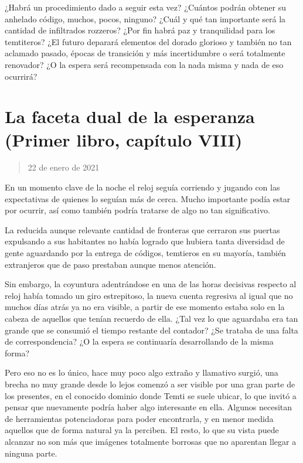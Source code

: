 \documentclass[
  spanish,
]{book}
\begin{document}
¿Habrá un procedimiento dado a seguir esta vez? ¿Cuántos podrán obtener su anhelado código, muchos, pocos, ninguno? ¿Cuál y qué tan importante será la cantidad de infiltrados rozzeros? ¿Por fin habrá paz y tranquilidad para los temtiteros? ¿El futuro deparará elementos del dorado glorioso y también no tan aclamado pasado, épocas de transición y más incertidumbre o será totalmente renovador? ¿O la espera será recompensada con la nada misma y nada de eso ocurrirá?

\hypertarget{la-faceta-dual-de-la-esperanza-primer-libro-capuxedtulo-viii}{%
\section{La faceta dual de la esperanza (Primer libro, capítulo VIII)}\label{la-faceta-dual-de-la-esperanza-primer-libro-capuxedtulo-viii}}

\begin{quote}
22 de enero de 2021
\end{quote}

En un momento clave de la noche el reloj seguía corriendo y jugando con las expectativas de quienes lo seguían más de cerca. Mucho importante podía estar por ocurrir, así como también podría tratarse de algo no tan significativo.

La reducida aunque relevante cantidad de fronteras que cerraron sus puertas expulsando a sus habitantes no había logrado que hubiera tanta diversidad de gente aguardando por la entrega de códigos, temtieros en su mayoría, también extranjeros que de paso prestaban aunque menos atención.

Sin embargo, la coyuntura adentrándose en una de las horas decisivas respecto al reloj había tomado un giro estrepitoso, la nueva cuenta regresiva al igual que no muchos días atrás ya no era visible, a partir de ese momento estaba solo en la cabeza de aquellos que tenían recuerdo de ella. ¿Tal vez lo que aguardaba era tan grande que se consumió el tiempo restante del contador? ¿Se trataba de una falta de correspondencia? ¿O la espera se continuaría desarrollando de la misma forma?

Pero eso no es lo único, hace muy poco algo extraño y llamativo surgió, una brecha no muy grande desde lo lejos comenzó a ser visible por una gran parte de los presentes, en el conocido dominio donde Temti se suele ubicar, lo que invitó a pensar que nuevamente podría haber algo interesante en ella. Algunos necesitan de herramientas potenciadoras para poder encontrarla, y en menor medida aquellos que de forma natural ya la perciben. El resto, lo que su vista puede alcanzar no son más que imágenes totalmente borrosas que no aparentan llegar a ninguna parte.
\end{document}

